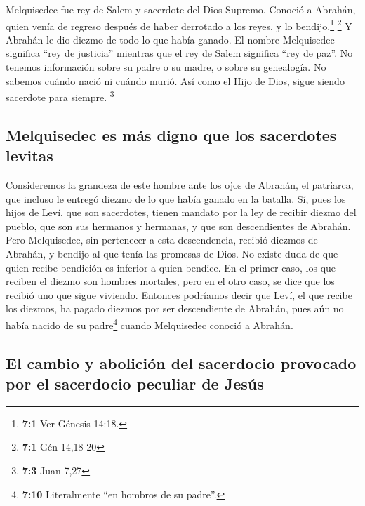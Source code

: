  Melquisedec fue rey de Salem y sacerdote del Dios
Supremo. Conoció a Abrahán, quien venía de regreso después de haber
derrotado a los reyes, y lo bendijo.\footnote{\textbf{7:1} Ver Génesis
  14:18.} \footnote{\textbf{7:1} Gén 14,18-20}  Y Abrahán
le dio diezmo de todo lo que había ganado. El nombre Melquisedec
significa ``rey de justicia'' mientras que el rey de Salem significa
``rey de paz''.  No tenemos información sobre su padre o
su madre, o sobre su genealogía. No sabemos cuándo nació ni cuándo
murió. Así como el Hijo de Dios, sigue siendo sacerdote para siempre.
\footnote{\textbf{7:3} Juan 7,27}

\hypertarget{melquisedec-es-muxe1s-digno-que-los-sacerdotes-levitas}{%
\subsection{Melquisedec es más digno que los sacerdotes
levitas}\label{melquisedec-es-muxe1s-digno-que-los-sacerdotes-levitas}}

 Consideremos la grandeza de este hombre ante los ojos de
Abrahán, el patriarca, que incluso le entregó diezmo de lo que había
ganado en la batalla.  Sí, pues los hijos de Leví, que son
sacerdotes, tienen mandato por la ley de recibir diezmo del pueblo, que
son sus hermanos y hermanas, y que son descendientes de Abrahán.
 Pero Melquisedec, sin pertenecer a esta descendencia,
recibió diezmos de Abrahán, y bendijo al que tenía las promesas de Dios.
 No existe duda de que quien recibe bendición es inferior
a quien bendice.  En el primer caso, los que reciben el
diezmo son hombres mortales, pero en el otro caso, se dice que los
recibió uno que sigue viviendo.  Entonces podríamos decir
que Leví, el que recibe los diezmos, ha pagado diezmos por ser
descendiente de Abrahán,  pues aún no había nacido de su
padre\footnote{\textbf{7:10} Literalmente ``en hombros de su padre''.}
cuando Melquisedec conoció a Abrahán.

\hypertarget{el-cambio-y-aboliciuxf3n-del-sacerdocio-provocado-por-el-sacerdocio-peculiar-de-jesuxfas}{%
\subsection{El cambio y abolición del sacerdocio provocado por el
sacerdocio peculiar de
Jesús}\label{el-cambio-y-aboliciuxf3n-del-sacerdocio-provocado-por-el-sacerdocio-peculiar-de-jesuxfas}}

